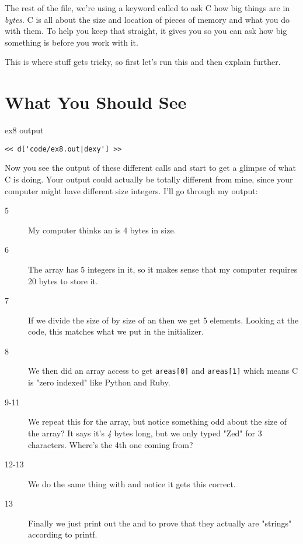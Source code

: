 The rest of the file, we're using a keyword called  to
ask C how big things are in \emph{bytes}.  C is all about the size
and location of pieces of memory and what you do with them.  To help
you keep that straight, it gives you  so you can ask
how big something is before you work with it.

This is where stuff gets tricky, so first let's run this and then
explain further.

\section{What You Should See}

\begin{code}{ex8 output}
\begin{lstlisting}
<< d['code/ex8.out|dexy'] >>
\end{lstlisting}
\end{code}

Now you see the output of these different  calls
and start to get a glimpse of what C is doing.  Your output could
actually be totally different from mine, since your computer might
have different size integers.  I'll go through my output:

\begin{description}
\item [5] My computer thinks an  is 4 bytes in size.
\item [6] The  array has 5 integers in it, so it makes
    sense that my computer requires 20 bytes to store it.
\item [7] If we divide the size of  by size of an 
    then we get 5 elements.  Looking at the code, this matches what 
    we put in the initializer.
\item [8] We then did an array access to get \verb|areas[0]| and 
    \verb|areas[1]| which means C is "zero indexed" like Python
    and Ruby.
\item [9-11] We repeat this for the  array, but notice
    something odd about the size of the array?  It says it's 
    \emph{4} bytes long, but we only typed "Zed" for 3 characters.
    Where's the 4th one coming from?
\item [12-13] We do the same thing with  and 
    notice it gets this correct.
\item [13] Finally we just print out the  and 
    to prove that they actually are "strings" according to printf.
\end{description}

